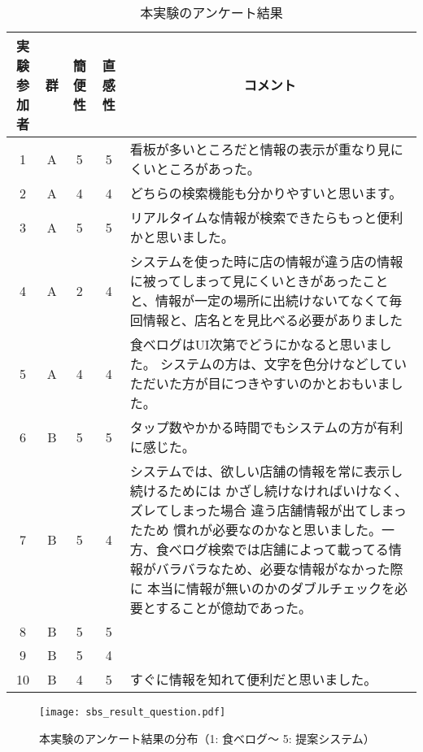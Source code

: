     \begin{table}
      \begin{center}
        \caption{本実験のアンケート結果}
        \label{table:exp_sbs_questionnaire}
        \begin{tabular}{c|cccp{8cm}}
          \hline \hline
          \textbf{実験参加者} & \textbf{群} & \textbf{簡便性} & \textbf{直感性} & \multicolumn{1}{c}{\textbf{コメント}} \\
          \hline
          1  & A & 5 & 5 & 看板が多いところだと情報の表示が重なり見にくいところがあった。 \\
          2  & A & 4 & 4 & どちらの検索機能も分かりやすいと思います。 \\
          3  & A & 5 & 5 & リアルタイムな情報が検索できたらもっと便利かと思いました。 \\
          4  & A & 2 & 4 & システムを使った時に店の情報が違う店の情報に被ってしまって見にくいときがあったことと、情報が一定の場所に出続けないてなくて毎回情報と、店名とを見比べる必要がありました \\
          5  & A & 4 & 4 & 食べログはUI次第でどうにかなると思いました。 システムの方は、文字を色分けなどしていただいた方が目につきやすいのかとおもいました。 \\
          6  & B & 5 & 5 & タップ数やかかる時間でもシステムの方が有利に感じた。 \\
          7  & B & 5 & 4 & システムでは、欲しい店舗の情報を常に表示し続けるためには かざし続けなければいけなく、ズレてしまった場合 違う店舗情報が出てしまったため 慣れが必要なのかなと思いました。一方、食べログ検索では店舗によって載ってる情報がバラバラなため、必要な情報がなかった際に 本当に情報が無いのかのダブルチェックを必要とすることが億劫であった。 \\
          8  & B & 5 & 5 &  \\
          9  & B & 5 & 4 &  \\
          10 & B & 4 & 5 & すぐに情報を知れて便利だと思いました。 \\
          \hline
        \end{tabular}
      \end{center}
    \end{table}    

    \begin{figure}[tb]
      \begin{center}
        \texttt{[image: sbs\_result\_question.pdf]}
        \caption{本実験のアンケート結果の分布（1: 食べログ〜 5: 提案システム）}
        \label{figure:exp_sbs_result_question}
      \end{center}
    \end{figure}